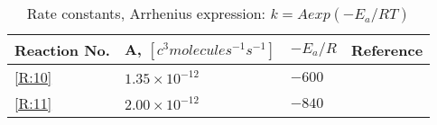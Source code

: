 \begin{table}[ht]
\centering
\begin{tabular}{|l|l|l|l|}
\hline
Reaction No.               & A, $[c^3molecules^{-1}s^{-1}]$ & $-E_a/R$ & Reference                     \\ \hline
\ref{R:10}  & $1.35\times10^{-12}$         & $-600$   & \cite{Sander} \\
\ref{R:11} & $2.00\times10^{-12}$         & $-840$   & \cite{Sander} \\ \hline
\end{tabular}
\caption{Rate constants, Arrhenius expression: $k = Aexp(-E_a/RT)$ \cite{Sander}}
\label{tab:rr_ocean_emis}
\end{table}